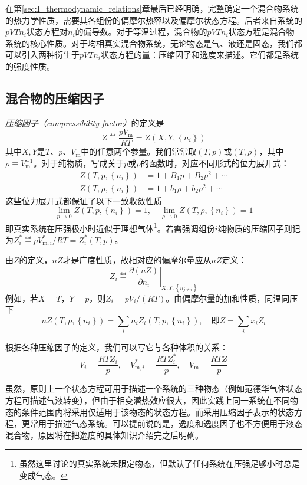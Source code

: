 \documentclass[main.tex]{subfiles}
\begin{document}
在第\ref{sec:I_thermodynamic_relations}章最后已经明确，完整确定一个混合物系统的热力学性质，需要其各组份的偏摩尔热容以及偏摩尔状态方程。后者来自系统的$pVTn_i$状态方程对$n_i$的偏导数。对于等温过程，混合物的$pVTn_i$状态方程是混合物系统的核心性质。对于均相真实混合物系统，无论物态是气、液还是固态，我们都可以引入两种衍生于$pVTn_i$状态方程的量：压缩因子和逸度来描述。它们都是系统的强度性质。

\subsection{混合物的压缩因子}
\emph{压缩因子（compressibility factor）}的定义是
\[Z\eqdef \frac{pV_\text{m}}{RT}=Z\left(X,Y,\left\{n_i\right\}\right)\]
其中$X,Y$是$T$、$p$、$V_\text{m}$中的任意两个参量。我们常常取$\left(T,p\right)$或$\left(T,\rho\right)$，其中$\rho\equiv V^{-1}_\text{m}$。对于纯物质，写成关于$p$或$\rho$的函数时，对应不同形式的位力展开式：
\begin{align*}
  Z\left(T,p,\left\{n_i\right\}\right)    & =1+B_1p+B_2p^2+\cdots       \\
  Z\left(T,\rho,\left\{n_i\right\}\right) & =1+b_1\rho+b_2\rho^2+\cdots
\end{align*}
这些位力展开式都保证了以下一致收敛性质
\[\lim_{p\to 0}Z\left(T,p,\left\{n_i\right\}\right)=1,\quad\lim_{\rho\to 0}Z\left(T,\rho,\left\{n_i\right\}\right)=1\]
即真实系统在压强极小时近似于理想气体\footnote{虽然这里讨论的真实系统未限定物态，但默认了任何系统在压强足够小时总是变成气态。}。若需强调组份$i$纯物质的压缩因子则记为$Z_i^*\eqdef pV_{\text{m},i}^*/RT=Z_i^*\left(T,p\right)$。

由$Z$的定义，$nZ$才是广度性质，故相对应的偏摩尔量应从$nZ$定义：
\[Z_i\eqdef\left.\frac{\partial\left(nZ\right)}{\partial n_i}\right|_{X,Y,\left\{n_{j\neq i}\right\}}\]
例如，若$X=T$，$Y=p$，则$Z_i=pV_i/\left(RT\right)$。由偏摩尔量的加和性质，同温同压下
\[nZ\left(T,p,\left\{n_i\right\}\right)=\sum_in_iZ_i\left(T,p,\left\{n_i\right\}\right),\quad \text{即}Z=\sum_ix_iZ_i\]

根据各种压缩因子的定义，我们可以写它与各种体积的关系：
\[V_i=\frac{RTZ_i}{p},\quad V_{\text{m},i}^*=\frac{RTZ_i^*}{p},\quad V_\text{m}=\frac{RTZ}{p}\]

虽然，原则上一个状态方程可用于描述一个系统的三种物态（例如范德华气体状态方程可描述气液转变），但由于相变潜热效应很大，因此实践上同一系统在不同物态的条件范围内将采用仅适用于该物态的状态方程。而采用压缩因子表示的状态方程，更常用于描述气态系统。可以提前说的是，逸度和逸度因子也不方便用于液态混合物，原因将在把逸度的具体知识介绍完之后明确。
\end{document}
